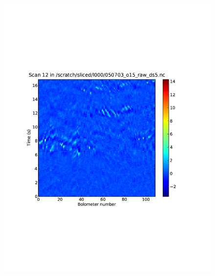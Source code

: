 \documentclass[12pt,preprint]{aastex}
\begin{document}
\setcounter{subfig}{1}
\begin{figure}
  \begin{minipage}{3.25in}
    \begin{center}
      \includegraphics[scale=0.5]{flagger_withglitch}
    \end{center}
  \end{minipage}
  \begin{minipage}{3.25in}
    \begin{center}

\end{center}
\end{minipage}
\end{figure}
\end{document}
